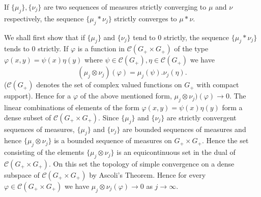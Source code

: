 \begin{lemma}\label{chap17:lem17.2}
If $\{ \mu_j\}, \{ \nu_j\}$ are two sequences of measures strictly
converging to $\mu$ and $\nu$ respectively, the sequence $\{\mu_j *
\nu_j\}$ strictly converges to $\mu * \nu$. 

We shall first show that if $\{\mu_j\}$ and $\{\nu_j\}$ tend to $0$
strictly, the sequence $\{\mu_j * \nu_j\}$ tends to $0$ strictly. If
$\varphi$ is a function in $\mathscr{C} (G_+ \times G_+)$ of
the type $\varphi(x, y) = \psi(x) \eta(y)$ where $\psi \in
\mathscr{C}(G_+), \eta \in \mathscr{C}(G_+)$ we have 
$$
(\mu_j \otimes \nu_j)(\varphi) = \mu_j (\psi). \nu_j(\eta).
$$
($\mathscr{C}(G_+)$ denotes the set of complex valued functions on
$G_+$ with compact support). Hence for a $\varphi$ of the above
mentioned form, $\mu_j \otimes \nu_j) (\varphi) \to 0$. The linear
combinations of elements of the form $\varphi(x, y)= \psi(x) \eta (y)$
form a dense subset of $\mathscr{C}(G_+ \times G_+)$. Since
$\{\mu_j\}$ and $\{\nu_j\}$ are strictly convergent sequen\-ces of
measures, $\{\mu_j\}$ and $\{\nu_j\}$ are bounded sequen\-ces of
measures and hence $\{\mu_j \otimes \nu_j\}$ is a bounded sequence of
measures on $G_+ \times G_+$. Hence the set consisting of the elements
$\{ \mu_j \otimes \nu_j\}$ is an equicontinuous set in the dual of
$\mathscr{C}(G_+ \times G_+)$. On this set the topology of simple
convergence on a dense subspace of $\mathscr{C}(G_+ \times G_+)$ by
Ascoli's Theorem. Hence for every $\varphi \in \mathscr{C}(G_+ \times
G_+)$ we have $\mu_j \otimes \nu_j(\varphi) \to 0$ as $j \to \infty$.
\end{lemma}

